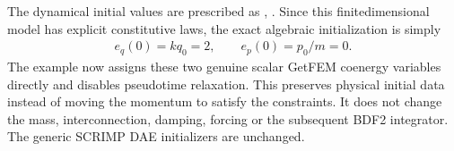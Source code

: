 \documentclass[letterpaper,10pt,english]{sphinxmanual}
\begin{document}
\sphinxAtStartPar
{} The dynamical
initial values are prescribed as , . Since this
finite\sphinxhyphen{}dimensional model has explicit constitutive laws, the exact
algebraic initialization is simply
\begin{equation*}
\begin{split}e_q(0)=kq_0=2,\qquad e_p(0)=p_0/m=0.\end{split}
\end{equation*}
\sphinxAtStartPar
The example now assigns these two genuine scalar GetFEM co\sphinxhyphen{}energy
variables directly and disables pseudo\sphinxhyphen{}time relaxation. This preserves
 physical initial data instead of moving the momentum to
satisfy the constraints. It does not change the mass, interconnection,
damping, forcing or the subsequent BDF2 integrator. The generic SCRIMP
DAE initializers are unchanged.
\end{document}

